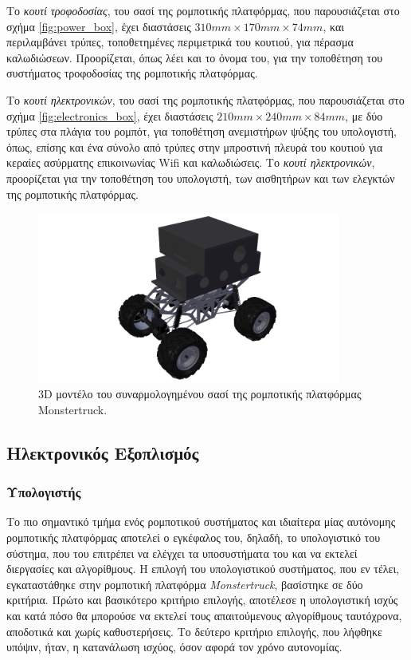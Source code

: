 \bigskip
Το \textit{κουτί τροφοδοσίας}, του σασί της ρομποτικής πλατφόρμας, που παρουσιάζεται στο σχήμα \ref{fig:power_box}, έχει διαστάσεις $310mm \times 170mm \times 74mm$, και περιλαμβάνει τρύπες, τοποθετημένες περιμετρικά του κουτιού, για πέρασμα καλωδιώσεων. Προορίζεται, όπως λέει και το όνομα του, για την τοποθέτηση του συστήματος τροφοδοσίας της ρομποτικής πλατφόρμας.

\bigskip
Το \textit{κουτί ηλεκτρονικών}, του σασί της ρομποτικής πλατφόρμας, που παρουσιάζεται στο σχήμα \ref{fig:electronics_box}, έχει διαστάσεις $210mm\times 240mm\times 84mm$, με δύο τρύπες στα πλάγια του ρομπότ, για τοποθέτηση ανεμιστήρων ψύξης του υπολογιστή, όπως, επίσης και ένα σύνολο από τρύπες στην μπροστινή πλευρά του κουτιού για κεραίες ασύρματης επικοινωνίας Wifi και καλωδιώσεις. Το \textit{κουτί ηλεκτρονικών}, προορίζεται για την τοποθέτηση του υπολογιστή, των αισθητήρων και των ελεγκτών της ρομποτικής πλατφόρμας.

\begin{figure}[!ht]
	\begin{center}
		\includegraphics[width=10cm]{Chapters/Chapter2/Figures/base_diag.png}
		\caption{3D μοντέλο του συναρμολογημένου σασί της ρομποτικής πλατφόρμας Monstertruck.}
		\label{fig:chassis}
	\end{center}
\end{figure}

\bigskip
\subsection{Ηλεκτρονικός Εξοπλισμός} \label{ssec:electronic_equipment}

\bigskip
\subsubsection{Υπολογιστής} \label{sssec:computer}
Το πιο σημαντικό τμήμα ενός ρομποτικού συστήματος και ιδιαίτερα μίας αυτόνομης ρομποτικής πλατφόρμας αποτελεί ο εγκέφαλος του, δηλαδή, το υπολογιστικό του σύστημα, που του επιτρέπει να ελέγχει τα υποσυστήματα του και να εκτελεί διεργασίες και αλγορίθμους. Η επιλογή του υπολογιστικού συστήματος, που εν τέλει, εγκαταστάθηκε στην ρομποτική πλατφόρμα \textit{Monstertruck}, βασίστηκε σε δύο κριτήρια. Πρώτο και βασικότερο κριτήριο επιλογής, αποτέλεσε η υπολογιστική ισχύς και κατά πόσο θα μπορούσε να εκτελεί τους απαιτούμενους αλγορίθμους ταυτόχρονα, αποδοτικά και χωρίς καθυστερήσεις. Το δεύτερο κριτήριο επιλογής, που λήφθηκε υπόψιν, ήταν, η κατανάλωση ισχύος, όσον αφορά τον χρόνο αυτονομίας.

